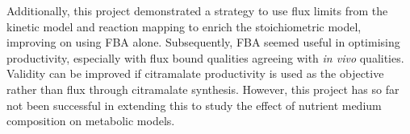 \documentclass[parskip=full, numbers=noenddot]{scrreprt}
\begin{document}
Additionally, this project demonstrated a strategy to use flux limits from the kinetic model and reaction mapping to enrich the stoichiometric model, improving on using FBA alone. Subsequently, FBA seemed useful in optimising productivity, especially with flux bound qualities agreeing with \emph{in vivo} qualities. Validity can be improved if citramalate productivity is used as the objective rather than flux through citramalate synthesis. However, this project has so far not been successful in extending this to study the effect of nutrient medium composition on metabolic models.



  
\end{document}
